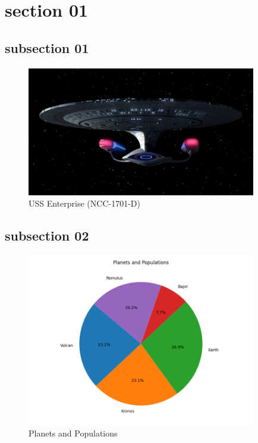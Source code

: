 \documentclass[class=book, crop=false]{standalone}
\begin{document}
\section{section 01}

\subsection{subsection 01}

\paragraph*{}
\blindtext\cite{latex2e}

\begin{figure}[htbp]
    \centering
    \includegraphics[width=10cm]{../../../figures_and_plots/figures/Enterprise_Forward.jpg}
    \caption{USS Enterprise (NCC-1701-D)}
    \label{fig:uss_enterprise}
\end{figure}

\paragraph*{}
\blindtext

\subsection{subsection 02}

\paragraph*{}
\Blindtext

\begin{figure}[htbp]
    \centering
    \includegraphics[width=10cm]{src/contents/figures_and_plots/plots/planets_and_populations.png}
    \caption{Planets and Populations}
    \label{fig:planets}
\end{figure}

\paragraph*{}
\blindmathpaper\cite{latex2e}
\end{document}
